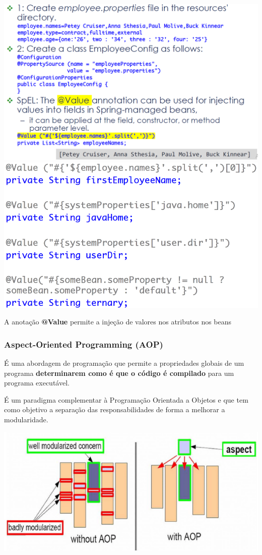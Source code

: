 \documentclass{article}
\begin{document}
\begin{center}
  \includegraphics[scale=0.3]{83}
  \includegraphics[scale=0.3]{84}
\end{center}

A anotação \textbf{@Value} permite a injeção de valores nos atributos nos beans

\subsubsection{Aspect-Oriented Programming (AOP)}

É uma abordagem de programação que permite a propriedades
globais de um programa \textbf{determinarem como é que o código
é compilado} para um programa executável.

É um paradigma complementar à Programação Orientada a Objetos e
que tem como objetivo a separação das responsabilidades de forma
a melhorar a modularidade.

\begin{center}
  \includegraphics[scale=0.5]{85}
\end{center}
\end{document}
